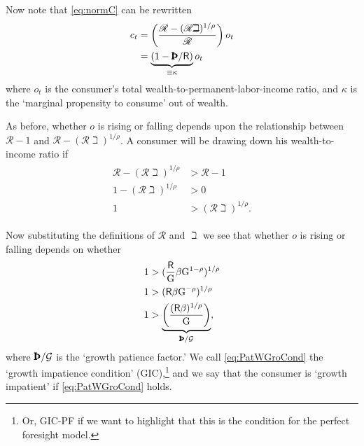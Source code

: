 \documentclass{scrartcl}
\begin{document}
Now note that \eqref{eq:normC} can be rewritten
\begin{equation}\begin{gathered}\begin{aligned}
        c_{t} & =  \left(\frac{\mathscr{R}-(\mathscr{R}\beth)^{1/\rho}}{\mathscr{R}}\right)o_{t}
\\ & =  \underbrace{(1 - \text{\pmb{\Thorn}}/{\mathsf{R}})}_{\equiv \kappa} o_{t}
\end{aligned}\end{gathered}\end{equation}
where $o_{t}$ is the consumer's total wealth-to-permanent-labor-income 
ratio, and $\kappa$ is the `marginal propensity to consume' out of wealth.

As before, whether $o$ is rising or falling depends upon the 
relationship between $\mathscr{R}-1$ and 
$\mathscr{R}-(\mathscr{R}\beth)^{1/\rho}$.
A consumer will be 
drawing down his wealth-to-income ratio if
\begin{equation}\begin{gathered}\begin{aligned}
        \mathscr{R}-(\mathscr{R}\beth)^{1/\rho} & >  \mathscr{R}-1  \\
        1-(\mathscr{R}\beth)^{1/\rho} & >  0  \\
        1 & >  (\mathscr{R}\beth)^{1/\rho}
.
\end{aligned}\end{gathered}\end{equation}

Now substituting the definitions of $\mathscr{R}$ and $\beth$
we see that whether $o$ is rising or falling depends on whether
\begin{equation}\begin{gathered}\begin{aligned}
        1 & >  (\frac{\mathsf{R}}{{\ensuremath{\mathrm{G}}}}\beta {\ensuremath{\mathrm{G}}}^{1-\rho})^{1/\rho}
\\  1 & >  (\mathsf{R}\beta {\ensuremath{\mathrm{G}}}^{-\rho})^{1/\rho}
\\  1 & >  \underbrace{\left(\frac{(\mathsf{R}\beta)^{1/\rho}}{\ensuremath{\mathrm{G}}}\right)}_{\text{\pmb{\Thorn}}/{\mathcal{G}}} \label{eq:PatWGroCond}
,
\end{aligned}\end{gathered}\end{equation}
where $\text{\pmb{\Thorn}}/{\mathcal{G}}$ is the `growth patience factor.'
We call \eqref{eq:PatWGroCond} the `growth impatience condition' (GIC),\footnote{Or, GIC-PF if we want to highlight that this is the condition for the perfect foresight model.} and we say that the consumer is
`growth impatient' if \eqref{eq:PatWGroCond} holds.
\end{document}
